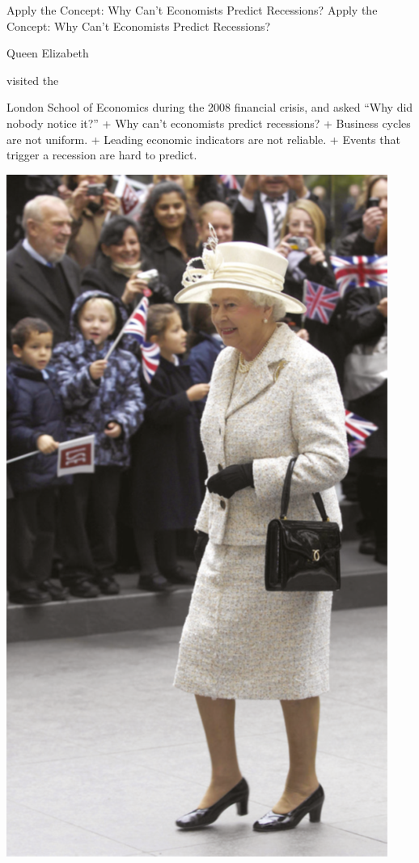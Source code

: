 \documentclass[
  12pt,
  ignorenonframetext,
]{beamer}
\begin{document}
\begin{frame}{Apply the Concept: Why Can't Economists Predict
Recessions?}
\label{apply-the-concept-why-cant-economists-predict-recessions}
Apply the Concept: Why Can't Economists Predict Recessions?

Queen Elizabeth

visited the

London School of Economics during the 2008 financial crisis, and asked
``Why did nobody notice it?'' + Why can't economists predict recessions?
+ Business cycles are not uniform. + Leading economic indicators are not
reliable. + Events that trigger a recession are hard to predict.

\includegraphics[width=\textwidth,height=0.99\textheight]{imgs3/img_slide43a.png}
\end{frame}
\end{document}
